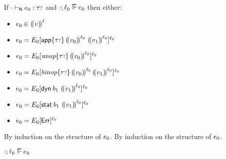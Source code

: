 \begin{lemma}\label{H-label-decomposition}
  If\/ ${\cdot} \vdash_{\mathsf{N}} e_0 : {\tau{\scriptstyle ?}}$
  and\/ $\snil; \sowner_0 \sWSOP \sexpr_0$
  then either:
  \begin{itemize}
    \item
      $e_0 \in {(\!(v)\!)}^{\ell}$
    \item
      $e_0 = E_0[\mathsf{app}{\{{\tau{\scriptstyle ?}}\}}\,{(\!( v_0)\!)}^{\ell_0}~{(\!( v_1)\!)}^{\ell_0}]^{\ell_0}$
    \item
      $e_0 = E_0[\textit{unop}{\{{\tau{\scriptstyle ?}}\}}\,{(\!( v_0)\!)}^{\ell_0}]^{\ell_0}$
    \item
      $e_0 = E_0[\textit{binop}{\{{\tau{\scriptstyle ?}}\}}\,{(\!( v_0)\!)}^{\ell_0}\,{(\!( v_1)\!)}^{\ell_0}]^{\ell_0}$
    \item
      $e_0 = E_0[\mathsf{dyn}^{}\,b_1~{(\!( v_1)\!)}^{\ell_0}]^{\ell_0}$
    \item
      $e_0 = E_0[\mathsf{stat}^{}\,b_1~{(\!( v_1)\!)}^{\ell_0}]^{\ell_0}$
    \item
      $e_0 = E_0[\mathsf{Err}]^{\ell_0}$
  \end{itemize}
\end{lemma}{
  \newcommand{\shortproof}{By induction on the structure of $\sexpr_0$.}
\begin{lamportproof*}
  \shortproof
\mainproof\leavevmode
  \shortproof

    \begin{pfproof}
      \absurdstep
        \begin{pfproof}
          $\snil; \sowner_0 \sWSOP \sexpr_0$
        \end{pfproof}
    \end{pfproof}

    \begin{pfproof}
      \qedstep
    \end{pfproof}


\end{lamportproof*}}
